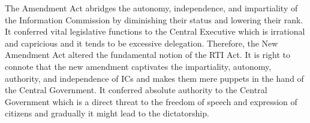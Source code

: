 \begin{multicols}{2}
\noi
The Amendment Act abridges the autonomy, independence, and impartiality of the
Information Commission by diminishing their status and lowering their rank. It conferred
vital legislative functions to the Central Executive which is irrational and capricious and it
tends to be excessive delegation. Therefore, the New Amendment Act altered the
fundamental notion of the RTI Act. It is right to connote that the new amendment captivates
the impartiality, autonomy, authority, and independence of ICs and makes them mere puppets
in the hand of the Central Government. It conferred absolute authority to the Central
Government which is a direct threat to the freedom of speech and expression of citizens and
gradually it might lead to the dictatorship.

\end{multicols}
